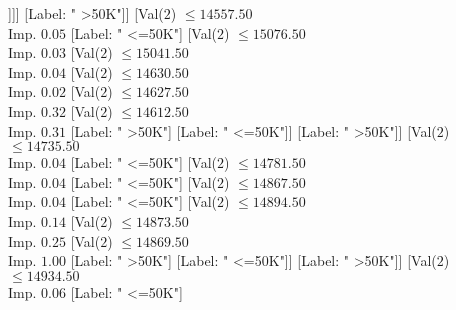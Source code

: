 \documentclass[margin=10pt]{standalone}
\begin{document}
\begin{forest}
																																										[Val($2$) $ \leq 14314.50$ \\ Imp. $0.72$
																																											[Label: " >50K"]
																																											[Label: " <=50K"]]]]
																																								[Label: " >50K"]]
																																							[Val($2$) $ \leq 14557.50$ \\ Imp. $0.05$
																																								[Label: " <=50K"]
																																								[Val($2$) $ \leq 15076.50$ \\ Imp. $0.03$
																																									[Val($2$) $ \leq 15041.50$ \\ Imp. $0.04$
																																										[Val($2$) $ \leq 14630.50$ \\ Imp. $0.02$
																																											[Val($2$) $ \leq 14627.50$ \\ Imp. $0.32$
																																												[Val($2$) $ \leq 14612.50$ \\ Imp. $0.31$
																																													[Label: " >50K"]
																																													[Label: " <=50K"]]
																																												[Label: " >50K"]]
																																											[Val($2$) $ \leq 14735.50$ \\ Imp. $0.04$
																																												[Label: " <=50K"]
																																												[Val($2$) $ \leq 14781.50$ \\ Imp. $0.04$
																																													[Label: " <=50K"]
																																													[Val($2$) $ \leq 14867.50$ \\ Imp. $0.04$
																																														[Label: " <=50K"]
																																														[Val($2$) $ \leq 14894.50$ \\ Imp. $0.14$
																																															[Val($2$) $ \leq 14873.50$ \\ Imp. $0.25$
																																																[Val($2$) $ \leq 14869.50$ \\ Imp. $1.00$
																																																	[Label: " >50K"]
																																																	[Label: " <=50K"]]
																																																[Label: " >50K"]]
																																															[Val($2$) $ \leq 14934.50$ \\ Imp. $0.06$
																																																[Label: " <=50K"]

\end{forest}
\end{document}
